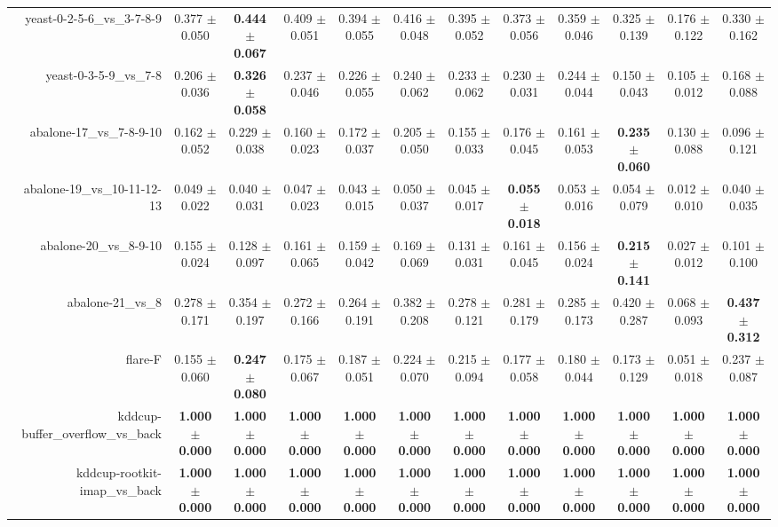 \begin{table}[!ht]
{\begin{tabular}{r c c c c c c c c c c c}
yeast-0-2-5-6\_vs\_3-7-8-9 & 0.377 $\pm$ 0.050 & \textbf{0.444 $\pm$ 0.067} & 0.409 $\pm$ 0.051 & 0.394 $\pm$ 0.055 & 0.416 $\pm$ 0.048 & 0.395 $\pm$ 0.052 & 0.373 $\pm$ 0.056 & 0.359 $\pm$ 0.046 & 0.325 $\pm$ 0.139 & 0.176 $\pm$ 0.122 & 0.330 $\pm$ 0.162 \\
yeast-0-3-5-9\_vs\_7-8 & 0.206 $\pm$ 0.036 & \textbf{0.326 $\pm$ 0.058} & 0.237 $\pm$ 0.046 & 0.226 $\pm$ 0.055 & 0.240 $\pm$ 0.062 & 0.233 $\pm$ 0.062 & 0.230 $\pm$ 0.031 & 0.244 $\pm$ 0.044 & 0.150 $\pm$ 0.043 & 0.105 $\pm$ 0.012 & 0.168 $\pm$ 0.088 \\
abalone-17\_vs\_7-8-9-10 & 0.162 $\pm$ 0.052 & 0.229 $\pm$ 0.038 & 0.160 $\pm$ 0.023 & 0.172 $\pm$ 0.037 & 0.205 $\pm$ 0.050 & 0.155 $\pm$ 0.033 & 0.176 $\pm$ 0.045 & 0.161 $\pm$ 0.053 & \textbf{0.235 $\pm$ 0.060} & 0.130 $\pm$ 0.088 & 0.096 $\pm$ 0.121 \\
abalone-19\_vs\_10-11-12-13 & 0.049 $\pm$ 0.022 & 0.040 $\pm$ 0.031 & 0.047 $\pm$ 0.023 & 0.043 $\pm$ 0.015 & 0.050 $\pm$ 0.037 & 0.045 $\pm$ 0.017 & \textbf{0.055 $\pm$ 0.018} & 0.053 $\pm$ 0.016 & 0.054 $\pm$ 0.079 & 0.012 $\pm$ 0.010 & 0.040 $\pm$ 0.035 \\
abalone-20\_vs\_8-9-10 & 0.155 $\pm$ 0.024 & 0.128 $\pm$ 0.097 & 0.161 $\pm$ 0.065 & 0.159 $\pm$ 0.042 & 0.169 $\pm$ 0.069 & 0.131 $\pm$ 0.031 & 0.161 $\pm$ 0.045 & 0.156 $\pm$ 0.024 & \textbf{0.215 $\pm$ 0.141} & 0.027 $\pm$ 0.012 & 0.101 $\pm$ 0.100 \\
abalone-21\_vs\_8 & 0.278 $\pm$ 0.171 & 0.354 $\pm$ 0.197 & 0.272 $\pm$ 0.166 & 0.264 $\pm$ 0.191 & 0.382 $\pm$ 0.208 & 0.278 $\pm$ 0.121 & 0.281 $\pm$ 0.179 & 0.285 $\pm$ 0.173 & 0.420 $\pm$ 0.287 & 0.068 $\pm$ 0.093 & \textbf{0.437 $\pm$ 0.312} \\
flare-F & 0.155 $\pm$ 0.060 & \textbf{0.247 $\pm$ 0.080} & 0.175 $\pm$ 0.067 & 0.187 $\pm$ 0.051 & 0.224 $\pm$ 0.070 & 0.215 $\pm$ 0.094 & 0.177 $\pm$ 0.058 & 0.180 $\pm$ 0.044 & 0.173 $\pm$ 0.129 & 0.051 $\pm$ 0.018 & 0.237 $\pm$ 0.087 \\
kddcup-buffer\_overflow\_vs\_back & \textbf{1.000 $\pm$ 0.000} & \textbf{1.000 $\pm$ 0.000} & \textbf{1.000 $\pm$ 0.000} & \textbf{1.000 $\pm$ 0.000} & \textbf{1.000 $\pm$ 0.000} & \textbf{1.000 $\pm$ 0.000} & \textbf{1.000 $\pm$ 0.000} & \textbf{1.000 $\pm$ 0.000} & \textbf{1.000 $\pm$ 0.000} & \textbf{1.000 $\pm$ 0.000} & \textbf{1.000 $\pm$ 0.000} \\
kddcup-rootkit-imap\_vs\_back & \textbf{1.000 $\pm$ 0.000} & \textbf{1.000 $\pm$ 0.000} & \textbf{1.000 $\pm$ 0.000} & \textbf{1.000 $\pm$ 0.000} & \textbf{1.000 $\pm$ 0.000} & \textbf{1.000 $\pm$ 0.000} & \textbf{1.000 $\pm$ 0.000} & \textbf{1.000 $\pm$ 0.000} & \textbf{1.000 $\pm$ 0.000} & \textbf{1.000 $\pm$ 0.000} & \textbf{1.000 $\pm$ 0.000} \\

\end{tabular}}
\end{table}
